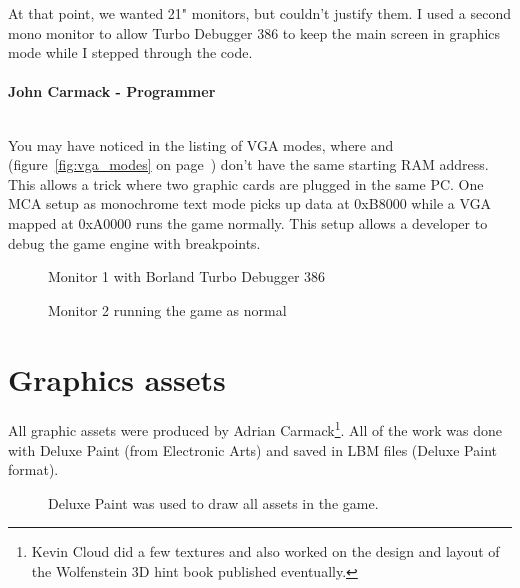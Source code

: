 \documentclass[book.tex]{subfiles}
\begin{document}
\begin{fancyquotes}
At that point, we wanted 21" monitors, but couldn't justify them.  I used a second mono monitor to allow Turbo Debugger 386 to keep the main screen in graphics mode while I stepped through the code.\\
 \\
\textbf{John Carmack - Programmer}
\end{fancyquotes}
\\
You may have noticed in the listing of VGA modes, where  and  (figure~\ref{fig:vga_modes} on page~\pageref{fig:vga_modes})  don't have the same starting RAM address. This allows a trick where two graphic cards are plugged in the same PC. One MCA setup as monochrome text mode picks up data at 0xB8000 while a VGA mapped at 0xA0000 runs the game normally. This setup allows a developer to debug the game engine with breakpoints.\\
\begin{figure}[H]
\centering
\caption{Monitor 1 with Borland Turbo Debugger 386}
\label{fig:dm1}
\end{figure}

\begin{figure}[H]
\centering
\caption{Monitor 2 running the game as normal}
\label{fig:dm1}
\end{figure}



 
 
 




\section{Graphics assets}

All graphic assets were produced by Adrian Carmack\footnote{Kevin Cloud did a few textures and also worked on the design and layout of the Wolfenstein 3D hint book published eventually.}. All of the work was done with Deluxe Paint (from Electronic Arts) and saved in LBM files (Deluxe Paint format). 

\begin{figure}[H]
  \centering
 \caption{Deluxe Paint was used to draw all assets in the game.}
\end{figure}
\end{document}
